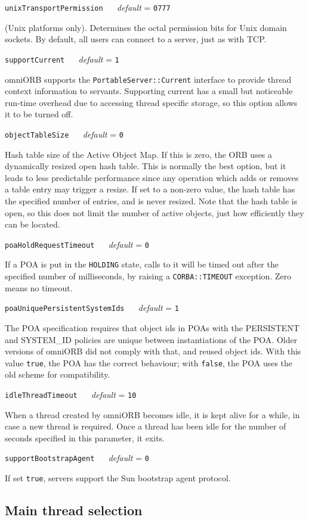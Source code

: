 \documentclass[11pt,oneside,a4paper]{book}
\makeatletter
\newcommand{\type}[1]{\texttt{#1}}
\newcommand{\code}[1]{\texttt{#1}}
\newcommand{\confopt}[2]
  {\vspace{\baselineskip}\par\noindent\code{#1} ~~ \textit{default} =
   \code{#2}}
\renewcommand{\confopt}[2]
  {\vspace{\baselineskip}\par\noindent\code{#1} ~~ \textit{default} =
   \code{#2}\\[-1ex]\@afterheading}
\makeatother
\begin{document}
\confopt{unixTransportPermission}{0777}

(Unix platforms only). Determines the octal permission bits for Unix
domain sockets. By default, all users can connect to a server, just as
with TCP.


\confopt{supportCurrent}{1}

omniORB supports the \type{PortableServer::Current} interface to
provide thread context information to servants. Supporting current has
a small but noticeable run-time overhead due to accessing thread
specific storage, so this option allows it to be turned off.


\confopt{objectTableSize}{0}

Hash table size of the Active Object Map. If this is zero, the ORB
uses a dynamically resized open hash table. This is normally the best
option, but it leads to less predictable performance since any
operation which adds or removes a table entry may trigger a resize. If
set to a non-zero value, the hash table has the specified number of
entries, and is never resized. Note that the hash table is open, so
this does not limit the number of active objects, just how efficiently
they can be located.


\confopt{poaHoldRequestTimeout}{0}

If a POA is put in the \code{HOLDING} state, calls to it will be timed
out after the specified number of milliseconds, by raising a
\code{CORBA::TIMEOUT} exception. Zero means no timeout.

\confopt{poaUniquePersistentSystemIds}{1}

The POA specification requires that object ids in POAs with the
PERSISTENT and SYSTEM\_ID policies are unique between instantiations
of the POA. Older versions of omniORB did not comply with that, and
reused object ids. With this value \code{true}, the POA has the
correct behaviour; with \code{false}, the POA uses the old scheme for
compatibility.

\confopt{idleThreadTimeout}{10}

When a thread created by omniORB becomes idle, it is kept alive for a
while, in case a new thread is required. Once a thread has been idle
for the number of seconds specified in this parameter, it exits.

\confopt{supportBootstrapAgent}{0}

If set \code{true}, servers support the Sun bootstrap agent protocol.


\subsection{Main thread selection}
\end{document}
